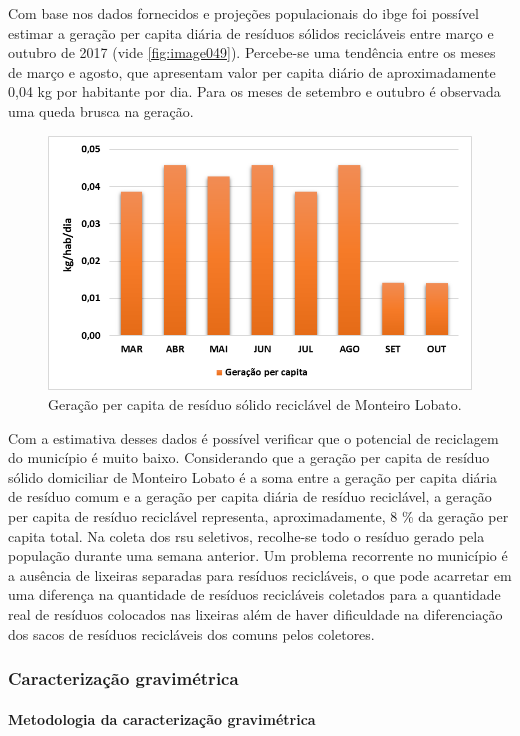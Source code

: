 Com base nos dados fornecidos e projeções populacionais do \gls{ibge} foi possível estimar a geração per capita diária de resíduos sólidos recicláveis entre março e outubro de 2017 (vide \autoref{fig:image049}). Percebe-se uma tendência entre os meses de março e agosto, que apresentam valor per capita diário de aproximadamente 0,04 kg por habitante por dia. Para os meses de setembro e outubro é observada uma queda brusca na geração.

\begin{figure}
	\centering
	\includegraphics[width=0.75\linewidth]{produtos/prodtres/image049}
	\caption{Geração per capita de resíduo sólido reciclável de Monteiro Lobato.}
	\label{fig:image049}
\end{figure}


Com a estimativa desses dados é possível verificar que o potencial de reciclagem do município é muito baixo. Considerando que a geração per capita de resíduo sólido domiciliar de Monteiro Lobato é a soma entre a geração per capita diária de resíduo comum e a geração per capita diária de resíduo reciclável, a geração per capita de resíduo reciclável representa, aproximadamente, 8 \% da geração per capita total.
Na coleta dos \gls{rsu} seletivos, recolhe-se todo o resíduo gerado pela população durante uma semana anterior. Um problema recorrente no município é a ausência de lixeiras separadas para resíduos recicláveis, o que pode acarretar em uma diferença na quantidade de resíduos recicláveis coletados para a quantidade real de resíduos colocados nas lixeiras além de haver dificuldade na diferenciação dos sacos de resíduos recicláveis dos comuns pelos coletores.

\subsubsection{Caracterização gravimétrica}

\paragraph{\textbf{Metodologia da caracterização gravimétrica}}


